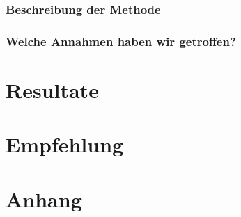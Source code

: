 \documentclass[a4paper,10pt]{report}
\begin{document}
    \subsection{Beschreibung der Methode}

    \subsection{Welche Annahmen haben wir getroffen?}


    \chapter{Resultate}


    \chapter{Empfehlung}


    \chapter{Anhang}
\end{document}
